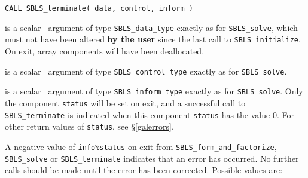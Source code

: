 \documentclass{galahad}
\newcommand{\packagename}{SBLS}
\begin{document}
\hspace{8mm}
{\tt CALL \packagename\_terminate( data, control, inform )}

\begin{description}

 is a scalar \intentinout\ argument of type 
{\tt \packagename\_data\_type} 
exactly as for
{\tt \packagename\_solve},
which must not have been altered {\bf by the user} since the last call to 
{\tt \packagename\_initialize}.
On exit, array components will have been deallocated.

 is a scalar \intentin\ argument of type 
{\tt \packagename\_control\_type}
exactly as for
{\tt \packagename\_solve}.

 is a scalar \intentout\ argument of type
{\tt \packagename\_inform\_type}
exactly as for
{\tt \packagename\_solve}.
Only the component {\tt status} will be set on exit, and a 
successful call to 
{\tt \packagename\_terminate}
is indicated when this  component {\tt status} has the value 0. 
For other return values of {\tt status}, see \S\ref{galerrors}.

\end{description}


\galerrors
A negative value of {\tt info\%status} on exit from 
{\tt \packagename\_form\_and\_factorize}, 
{\tt \packagename\_solve}
or 
{\tt \packagename\_terminate}
indicates that an error has occurred. No further calls should be made
until the error has been corrected. Possible values are:
\end{document}
